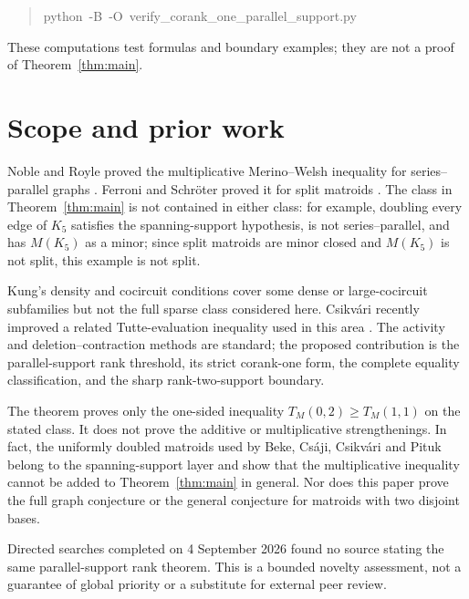 \documentclass[11pt]{article}
\begin{document}
\begin{quote}\footnotesize\ttfamily
python\ \allowbreak{}-\allowbreak{}B\ \allowbreak{}-\allowbreak{}O\ \allowbreak{}verify\_\allowbreak{}corank\_\allowbreak{}one\_\allowbreak{}parallel\_\allowbreak{}support.py\par
\end{quote}


These computations test formulas and boundary examples; they are not a proof
of Theorem~\ref{thm:main}.

\section{Scope and prior work}


Noble and Royle proved the multiplicative Merino--Welsh inequality for
series--parallel graphs \cite{noble-royle}. Ferroni and Schröter proved it for split matroids
\cite{ferroni-schroeter}. The class in Theorem~\ref{thm:main} is not contained in either class: for example,
doubling every edge of \(K_5\) satisfies the spanning-support hypothesis, is
not series--parallel, and has \(M(K_5)\) as a minor; since split matroids are
minor closed and \(M(K_5)\) is not split, this example is not split.

Kung's density and cocircuit conditions \cite{kung} cover some dense or large-cocircuit
subfamilies but not the full sparse class considered here. Csikvári recently
improved a related Tutte-evaluation inequality used in this area \cite{csikvari}. The activity
and deletion--contraction methods are standard; the proposed contribution is the
parallel-support rank threshold, its strict corank-one form, the complete
equality classification, and the sharp rank-two-support boundary.

The theorem proves only the one-sided inequality \(T_M(0,2)\ge T_M(1,1)\)
on the stated class. It does not prove the additive or multiplicative
strengthenings. In fact, the uniformly doubled matroids used by Beke,
Csáji, Csikvári and Pituk \cite{beke-et-al} belong to the spanning-support layer and show
that the multiplicative inequality cannot be added to Theorem~\ref{thm:main} in general.
Nor does this paper prove the full graph conjecture or the general conjecture
for matroids with two disjoint bases.

Directed searches completed on 4 September 2026 found no source stating the
same parallel-support rank theorem. This is a bounded novelty assessment, not
a guarantee of global priority or a substitute for external peer review.
\end{document}
